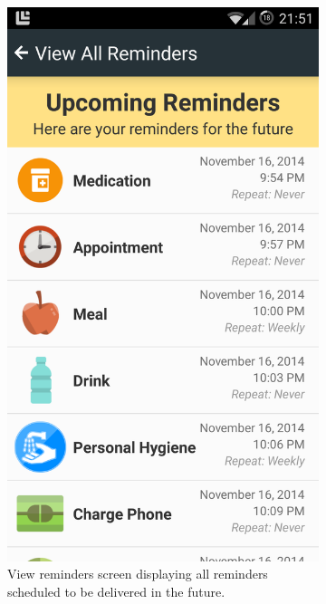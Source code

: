 \begin{figure}[]
    \centering
    \begin{subfigure}[t]{0.48\textwidth}
        \centering
       \includegraphics[width=\textwidth]{Files/treatment-study-1/figures/app-reminderslist}
        \caption{View reminders screen displaying all reminders scheduled to be delivered in the future.}
        \label{fig: taut-reminderslist}
    \end{subfigure}
    \hfill
     \begin{subfigure}[t]{0.48\textwidth}

\end{subfigure}
\end{figure}
